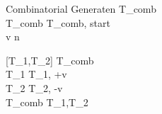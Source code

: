 
\begin{pseudocode}{Combinatorial Generate}{n}
	T_{comb} \GETS \emptyset \\
	T_{comb} \GETS {}T_{comb}, start\text{)} \\ 

	\FOR v   n \DO
		\BEGIN
		
		[T_1,T_2] \GETS {} T_{comb}\text{)}\\
		T_1 \GETS {}T_1, +v \text{)}\\
		T_2 \GETS {}T_2, -v \text{)}\\
		T_{comb} \GETS {}T_1,T_2\text{)}\\
	\END
	\\
\end{pseudocode}

